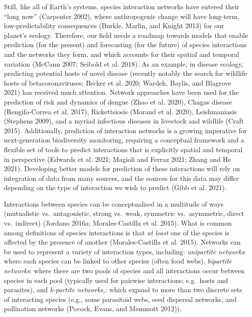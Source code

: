 \documentclass[10pt,oneside]{article}
\begin{document}
Still, like all of Earth's systems, species interaction networks have
entered their ``long now'' (Carpenter 2002), where anthropogenic change
will have long-term, low-predictability consequences (Burkle, Marlin,
and Knight 2013) for our planet's ecology. Therefore, our field needs a
roadmap towards models that enable prediction (for the present) and
forecasting (for the future) of species interactions and the networks
they form, and which accounts for their spatial and temporal variation
(McCann 2007; Seibold et al. 2018). As an example, in disease ecology,
predicting potential hosts of novel disease (recently notably the search
for wildlife hosts of betacoronaviruses; Becker et al. 2020; Wardeh,
Baylis, and Blagrove 2021) has received much attention. Network
approaches have been used for the prediction of risk and dynamics of
dengue (Zhao et al. 2020), Chagas disease (Rengifo-Correa et al. 2017),
Rickettsiosis (Morand et al. 2020), Leishmaniasis (Stephens 2009), and a
myriad infectious diseases in livestock and wildlife (Craft 2015).
Additionally, prediction of interaction networks is a growing imperative
for next-generation biodiversity monitoring, requiring a conceptual
framework and a flexible set of tools to predict interactions that is
explicitly spatial and temporal in perspective (Edwards et al. 2021;
Magioli and Ferraz 2021; Zhang and He 2021). Developing better models
for prediction of these interactions will rely on integration of data
from many sources, and the sources for this data may differ depending on
the type of interaction we wish to predict (Gibb et al. 2021).

Interactions between species can be conceptualised in a multitude of
ways (mutualistic vs.~antagonistic, strong vs.~weak, symmetric
vs.~asymmetric, direct vs.~indirect) (Jordano 2016a; Morales-Castilla et
al. 2015). What is common among definitions of species interactions is
that \emph{at least} one of the species is affected by the presence of
another (Morales-Castilla et al. 2015). Networks can be used to
represent a variety of interaction types, including: \emph{unipartite
networks}: where each species can be linked to other species (often food
webs), \emph{bipartite networks}: where there are two pools of species
and all interactions occur between species in each pool (typically used
for pairwise interactions; e.g.~hosts and parasites), and
\emph{k-partite networks,}: which expand to more than two discrete sets
of interacting species (e.g., some parasitoid webs, seed dispersal
networks, and pollination networks (Pocock, Evans, and Memmott 2012)).
\end{document}
